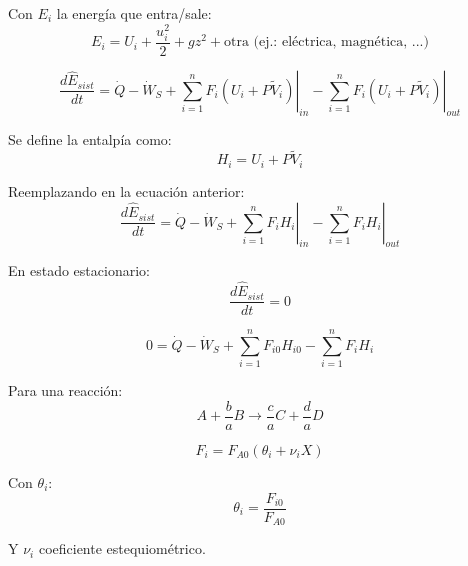         Con \(E_{i}\) la energía que entra/sale:
        \[E_{i} = U_{i} + \frac{u_{i}^{2}}{2} + g{z}^{2} + \text{otra (ej.: eléctrica, magnética, ...)}\]
        
        \begin{quote}
            \textit{}
        \end{quote}
        
        \[\frac{d\hat{E}_{sist}}{dt} = \dot{Q} - \dot{W}_{S} + \left . \sum_{i=1}^{n} F_{i} \left ( U_{i} + P\widetilde{V}_{i} \right ) \right |_{in} - \left . \sum_{i=1}^{n} F_{i} \left ( U_{i} + P\widetilde{V}_{i} \right ) \right |_{out}\]
        
        Se define la entalpía como:
        \begin{equation}
        \label{eq:entalpia}
            H_{i} = U_{i} + P \widetilde{V}_{i}
        \end{equation}
        
        Reemplazando en la ecuación anterior:
        \begin{equation}
        \label{eq:balance_energia}
            \frac{d\hat{E}_{sist}}{dt} = \dot{Q} - \dot{W}_{S} + \left . \sum_{i=1}^{n} F_{i} H_{i} \right |_{in} - \left . \sum_{i=1}^{n} F_{i} H_{i} \right |_{out}
        \end{equation}
        
        En estado estacionario:
        \[\frac{d\hat{E}_{sist}}{dt} = 0\]
        
        \begin{equation}
        \label{eq:balance_energia_estado_estacionario_parcial_1}
            0 = \dot{Q} - \dot{W}_{S} + \sum_{i=1}^{n} F_{i0} H_{i0} - \sum_{i=1}^{n} F_{i} H_{i}
        \end{equation}
        
        Para una reacción:
        \[A + \frac{b}{a} B \rightarrow \frac{c}{a}C + \frac{d}{a}D\]
        
        \[F_{i} = F_{A0} \left ( \theta_{i} + \nu_{i}X \right )\]
        
        Con \(\theta_{i}\):
        \[\theta_{i} = \frac{F_{i0}}{F_{A0}}\]
        
        Y \(\nu_{i}\) coeficiente estequiométrico.
        

